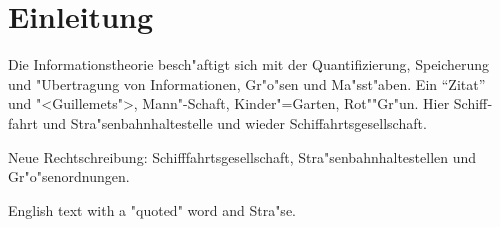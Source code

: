 \documentclass[11pt]{report}
\begin{document}
\chapter{Einleitung}
Die Informationstheorie besch"aftigt sich mit der Quantifizierung, Speicherung und "Ubertragung von Informationen, Gr"o"sen und Ma"sst"aben. Ein "`Zitat"' und "<Guillemets">, Mann"-Schaft, Kinder"=Garten, Rot""Gr"un.
Hier \foreignlanguage{ngerman}{Schifffahrt und Stra"senbahnhaltestelle} und wieder Schiffahrtsgesellschaft.

Neue Rechtschreibung: Schifffahrtsgesellschaft, Stra"senbahnhaltestellen und Gr"o"senordnungen.

English text with a "quoted" word and Stra"se.
\end{document}
